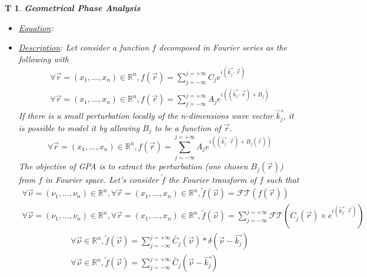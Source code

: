 \documentclass[12pt]{article}
\newtheorem{T}{T}
\begin{document}
\begin{T}
\label{T_2}
\noindent\colorbox{shadecolorT}{\normalfont \textbf{Geometrical Phase Analysis}}
\normalfont
\begin{itemize}
\item \underline{Equation}: 
\item \underline{Description}: Let consider a function $f$ decomposed in Fourier series as the following with 
\begin{equation}
\begin{gathered}
\forall \vec{r}=(x_1,...,x_n) \in \mathbb{R}^n, f(\vec{r})=\sum_{j=-\infty}^{j=+\infty}C_je^{i(\vec{k_j}\cdot\vec{r})} \\
\forall \vec{r}=(x_1,...,x_n) \in \mathbb{R}^n, f(\vec{r})=\sum_{j=-\infty}^{j=+\infty}A_je^{i((\vec{k_j}\cdot\vec{r})+B_j)}
\end{gathered}
\end{equation}
If there is a small perturbation locally of the n-dimensions wave vector $\vec{k_j}$, it is possible to model it by allowing $B_j$ to be a function of $\vec{r}$. 
\begin{equation}
\forall \vec{r}=(x_1,...,x_n) \in \mathbb{R}^n, f(\vec{r})=\sum_{j=-\infty}^{j=+\infty}A_je^{i((\vec{k_j}\cdot\vec{r})+B_j(\vec{r}))}
\end{equation}
The objective of GPA is to extract the perturbation (one chosen $B_j(\vec{r})$) from $f$ in Fourier space. Let's consider $\widetilde{f}$ the Fourier transform of $f$ such that
\begin{equation*}
\begin{gathered}
\forall \vec{\nu}=(\nu_1,...,\nu_n) \in \mathbb{R}^n, \forall \vec{r}=(x_1,...,x_n) \in \mathbb{R}^n, \widetilde{f}(\vec{\nu})=\mathcal{FT}(f(\vec{r})) \\
\forall \vec{\nu}=(\nu_1,...,\nu_n) \in \mathbb{R}^n, \forall \vec{r}=(x_1,...,x_n) \in \mathbb{R}^n, \widetilde{f}(\vec{\nu})=\sum_{j=-\infty}^{j=+\infty}\mathcal{FT}(C_j(\vec{r})\times e^{i(\vec{k_j}\cdot\vec{r})})
\end{gathered}
\end{equation*}
\begin{equation}
\begin{gathered}
\forall \vec{\nu}\in \mathbb{R}^n, \widetilde{f}(\vec{\nu})=\sum_{j=-\infty}^{j=+\infty}\widetilde{C_j}(\vec{\nu})\ast\delta(\vec{\nu}-\vec{k_j})\\
\forall \vec{\nu}\in \mathbb{R}^n, \widetilde{f}(\vec{\nu})=\sum_{j=-\infty}^{j=+\infty}\widetilde{C_j}(\vec{\nu}-\vec{k_j})

\end{gathered}
\end{equation}
\end{itemize}
\end{T}
\end{document}
